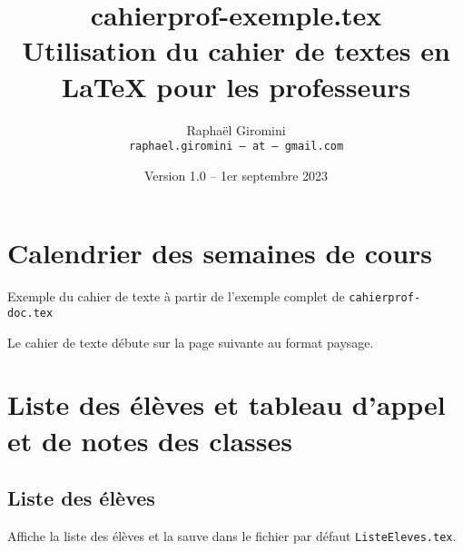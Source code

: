 \documentclass[a4paper,french,10pt]{article}
\title{
  cahierprof-exemple.tex\\
  Utilisation du cahier de textes en \LaTeX{} pour les professeurs
}
\author{
  Raphaël Giromini\\
  \texttt{raphael.giromini -- at -- gmail.com}
}
\date{Version 1.0 -- 1er septembre 2023}
\begin{document}
\maketitle

\section{Calendrier des semaines de cours}

Exemple du cahier de texte à partir de l'exemple complet de
\texttt{cahierprof-doc.tex}

Le cahier de texte débute sur la page suivante au format paysage.

\begin{landscape}
\end{landscape}

\section{Liste des élèves et tableau d'appel et de notes des classes}

\subsection{Liste des élèves}

Affiche la liste des élèves et la sauve dans le fichier par défaut
\texttt{ListeEleves.tex}.
\ListeEleves{}
\end{document}
